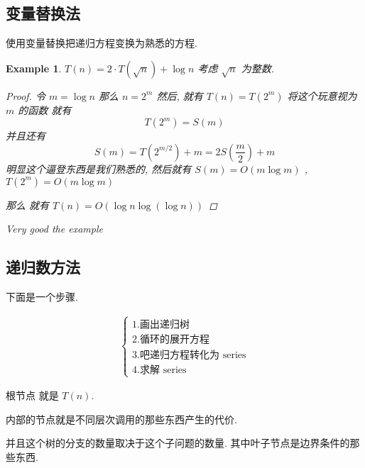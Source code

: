 \documentclass[a4paper, 10pt]{ctexart} %
\newtheorem{example}{Example}
\begin{document}
\subsection{变量替换法}
使用变量替换把递归方程变换为熟悉的方程. 
\begin{example}
    $T \left(n\right) = 2 \cdot  T \left(\sqrt n\right) +\log n$ 考虑 $\sqrt n$ 为整数. 
    \begin{proof}
        令 $  m  =\log  n  $ 那么 $n  =2 ^{m} $ 然后, 就有 $T \left(n\right) =  T \left( 2 ^{m}\right)$ 将这个玩意视为 $m$ 的函数 就有 
        \[
        T\left(2 ^{m} \right)  = S\left(m\right) 
        \]
        并且还有 
        \[
        S \left( m \right) = T \left( 2 ^{ m  / 2}\right) + m = 2 S \left( \frac{m}{2}\right) + m
        \]
        明显这个逼登东西是我们熟悉的, 然后就有 $S\left(m\right)  = O\left( m \log m\right)$ , $T \left( 2^{m}\right) =  O\left( m \log  m \right)$

        那么 就有 $T \left( n\right)  =   O \left( \log  n \log  \left( \log n\right)\right)$
    \end{proof}
    Very good the example
\end{example}


\subsection{递归数方法}
下面是一个步骤.
\begin{figure}[H]
    \centering
    \begin{align*}
        \begin{cases}
            1. \text{画出递归树} \\ 
            2. \text{循环的展开方程}\\
            3. \text{吧递归方程转化为 series} \\
            4. \text{求解 series}
        \end{cases}
    \end{align*}
\end{figure}

根节点 就是 $ T\left(n\right)$. 

内部的节点就是不同层次调用的那些东西产生的代价. 

并且这个树的分支的数量取决于这个子问题的数量. 其中叶子节点是边界条件的那些东西. 
\end{document}
